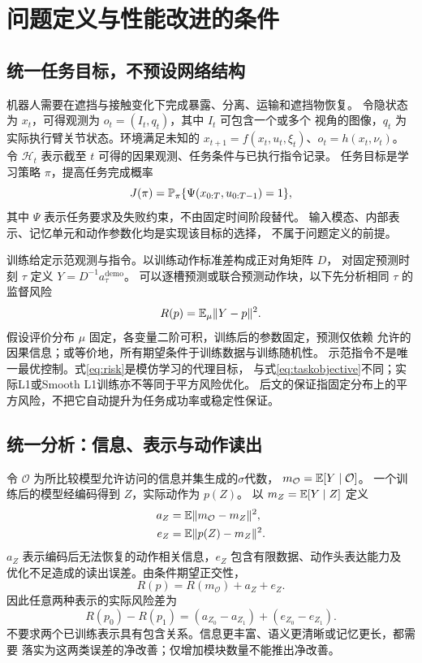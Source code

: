 \section{问题定义与性能改进的条件}
\label{sec:analysis}
\subsection{统一任务目标，不预设网络结构}
机器人需要在遮挡与接触变化下完成暴露、分离、运输和遮挡物恢复。
令隐状态为 $x_t$，可得观测为 $o_t=(I_t,q_t)$，其中 $I_t$ 可包含一个或多个
视角的图像，$q_t$ 为实际执行臂关节状态。环境满足未知的
$x_{t+1}=f(x_t,u_t,\xi_t)$、$o_t=h(x_t,\nu_t)$。
令 $\mathcal H_t$ 表示截至 $t$ 可得的因果观测、任务条件与已执行指令记录。
任务目标是学习策略 $\pi$，提高任务完成概率
\begin{equation}
 J(\pi)=\mathbb P_\pi\{\Psi(x_{0:T},u_{0:T-1})=1\},
 \label{eq:taskobjective}
\end{equation}
其中 $\Psi$ 表示任务要求及失败约束，不由固定时间阶段替代。
输入模态、内部表示、记忆单元和动作参数化均是实现该目标的选择，
不属于问题定义的前提。

训练给定示范观测与指令。以训练动作标准差构成正对角矩阵 $D$，
对固定预测时刻 $\tau$ 定义 $Y=D^{-1}a^{\mathrm{demo}}_\tau$。
可以逐槽预测或联合预测动作块，以下先分析相同 $\tau$ 的监督风险
\begin{equation}
 R(p)=\mathbb E_\mu\lVert Y-p\rVert^2.
 \label{eq:risk}
\end{equation}
假设评价分布 $\mu$ 固定，各变量二阶可积，训练后的参数固定，预测仅依赖
允许的因果信息；或等价地，所有期望条件于训练数据与训练随机性。
示范指令不是唯一最优控制。式\eqref{eq:risk}是模仿学习的代理目标，
与式\eqref{eq:taskobjective}不同；实际L1或Smooth L1训练亦不等同于平方风险优化。
后文的保证指固定分布上的平方风险，不把它自动提升为任务成功率或稳定性保证。

\subsection{统一分析：信息、表示与动作读出}
令 $\mathcal O$ 为所比较模型允许访问的信息并集生成的$\sigma$代数，
$m_{\mathcal O}=\mathbb E[Y\mid\mathcal O]$。
一个训练后的模型经编码得到 $Z$，实际动作为 $p(Z)$。
以 $m_Z=\mathbb E[Y\mid Z]$ 定义
\begin{align}
 a_Z&=\mathbb E\lVert m_{\mathcal O}-m_Z\rVert^2,\nonumber\\
 e_Z&=\mathbb E\lVert p(Z)-m_Z\rVert^2.
 \label{eq:reprerrors}
\end{align}
$a_Z$ 表示编码后无法恢复的动作相关信息，$e_Z$ 包含有限数据、动作头表达能力及
优化不足造成的读出误差。由条件期望正交性\cite{shalizi2020prediction}，
\begin{equation}
 R(p)=R(m_{\mathcal O})+a_Z+e_Z.
 \label{eq:representation}
\end{equation}
因此任意两种表示的实际风险差为
\begin{equation}
 R(p_0)-R(p_1)=(a_{Z_0}-a_{Z_1})+(e_{Z_0}-e_{Z_1}).
 \label{eq:reprcompare}
\end{equation}
不要求两个已训练表示具有包含关系。信息更丰富、语义更清晰或记忆更长，都需要
落实为这两类误差的净改善；仅增加模块数量不能推出净改善。

